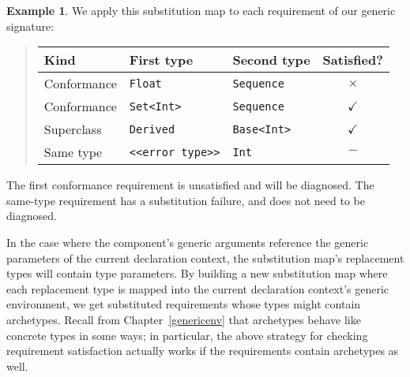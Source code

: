 \documentclass[a4paper,headsepline,bibliography=totoc,toc=flat,fleqn,twoside=semi]{scrbook}
\theoremstyle{definition}
\theoremstyle{definition}
\newtheorem{example}{Example}[chapter]
\theoremstyle{definition}
\begin{document}
\begin{example}
We apply this substitution map to each requirement of our generic signature:
\begin{quote}
\begin{tabular}{|l|l|l|c|}
\hline
Kind&First type&Second type&Satisfied?\\
\hline
Conformance&\texttt{Float}&\texttt{Sequence}&$\times$\\
Conformance&\texttt{Set<Int>}&\texttt{Sequence}&$\checkmark$\\
Superclass&\texttt{Derived}&\texttt{Base<Int>}&$\checkmark$\\
Same type&\texttt{<<error type>>}&\texttt{Int}&$-$\\
\hline
\end{tabular}
\end{quote}
The first conformance requirement is unsatisfied and will be diagnosed. The same-type requirement has a substitution failure, and does not need to be diagnosed.
\end{example}

In the case where the component's generic arguments reference the generic parameters of the current declaration context, the substitution map's replacement types will contain type parameters. By building a new substitution map where each replacement type is mapped into the current declaration context's generic environment, we get substituted requirements whose types might contain archetypes. Recall from Chapter~\ref{genericenv} that archetypes behave like concrete types in some ways; in particular, the above strategy for checking requirement satisfaction actually works if the requirements contain archetypes as well.
\end{document}
